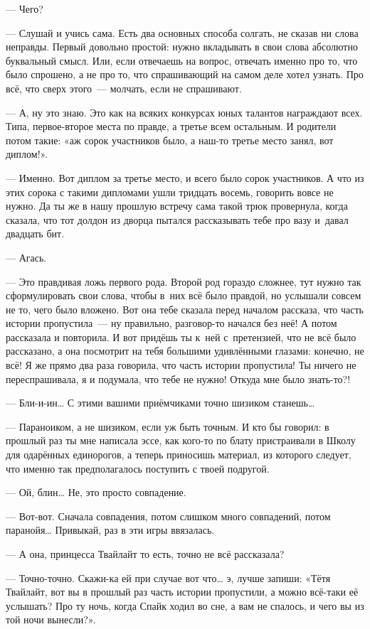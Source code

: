 \documentclass[fontsize=11pt,a5paper,titlepage=firstcover]{scrbook}
\begin{document}
--- Чего?

--- Слушай и учись сама. Есть два основных способа солгать, не сказав ни слова неправды. Первый довольно простой: нужно вкладывать в свои слова абсолютно буквальный смысл. Или, если отвечаешь на вопрос, отвечать именно про то, что было спрошено, а не про то, что спрашивающий на самом деле хотел узнать. Про всё, что сверх этого~--- молчать, если не спрашивают.

--- А, ну это знаю. Это как на всяких конкурсах юных талантов награждают всех. Типа, первое-второе места по правде, а третье всем остальным. И родители потом такие: «аж сорок участников было, а наш-то третье место занял, вот диплом!».

--- Именно. Вот диплом за третье место, и всего было сорок участников. А что из этих сорока с такими дипломами ушли тридцать восемь, говорить вовсе не нужно. Да ты же в нашу прошлую встречу сама такой трюк провернула, когда сказала, что тот долдон из дворца пытался рассказывать тебе про вазу и~давал двадцать бит.

--- Агась.

--- Это правдивая ложь первого рода. Второй род гораздо сложнее, тут нужно так сформулировать свои слова, чтобы в~них всё было правдой, но услышали совсем не то, чего было вложено. Вот она тебе сказала перед началом рассказа, что часть истории пропустила~--- ну правильно, разговор-то начался без неё! А потом рассказала и повторила. И вот придёшь ты к~ней с~претензией, что не всё было рассказано, а она посмотрит на тебя большими удивлёнными глазами: конечно, не всё! Я же прямо два раза говорила, что часть истории пропустила! Ты ничего не переспрашивала, я и подумала, что тебе не нужно! Откуда мне было знать-то?!

--- Бли-и-ин{\ldots} С этими вашими приёмчиками точно шизиком станешь{\ldots}

--- Параноиком, а не шизиком, если уж быть точным. И кто бы говорил: в прошлый раз ты мне написала эссе, как кого-то по блату пристраивали в Школу для одарённых единорогов, а теперь приносишь материал, из которого следует, что именно так предполагалось поступить с твоей подругой.

--- Ой, блин{\ldots} Не, это просто совпадение.

--- Вот-вот. Сначала совпадения, потом слишком много совпадений, потом паранойя{\ldots} Привыкай, раз в эти игры ввязалась.

--- А она, принцесса Твайлайт то есть, точно не всё рассказала?

--- Точно-точно. Скажи-ка ей при случае вот что{\ldots} э, лучше запиши: «Тётя Твайлайт, вот вы в прошлый раз часть истории пропустили, а можно всё-таки её услышать? Про ту ночь, когда Спайк ходил во сне, а вам не спалось, и чего вы из той ночи вынесли?».
\end{document}
